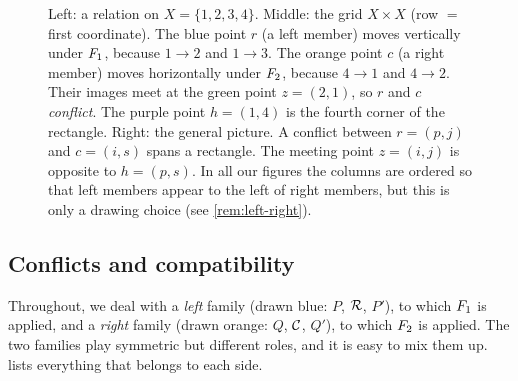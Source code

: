 \begin{figure}[ht]
\caption{Left: a relation on $X=\{1,2,3,4\}$. Middle: the grid $X\times X$
(row $=$ first coordinate). The blue point $r$ (a left member) moves
vertically under $F_1$, because $1\to2$ and $1\to3$. The orange point $c$
(a right member) moves horizontally under $F_2$, because $4\to1$ and
$4\to2$. Their images meet at the green point $z=(2,1)$, so $r$ and $c$
\emph{conflict}. The purple point $h=(1,4)$ is the fourth corner of the
rectangle. Right: the general picture. A conflict between $r=(p,j)$ and
$c=(i,s)$ spans a rectangle. The meeting point $z=(i,j)$ is opposite to
$h=(p,s)$. In all our figures the columns are ordered so that left members
appear to the left of right members, but this is only a drawing choice
(see \cref{rem:left-right}).}
\label{fig:coord}
\end{figure}

\subsection{Conflicts and compatibility}

Throughout, we deal with a \emph{left} family (drawn blue: $P$, $\mathcal R$, $P'$),
to which $F_1$ is applied, and a \emph{right} family (drawn orange: $Q$,
$\mathcal C$, $Q'$), to which $F_2$ is applied. The two families play symmetric
but different roles, and it is easy to mix them up.  lists
everything that belongs to each side.

